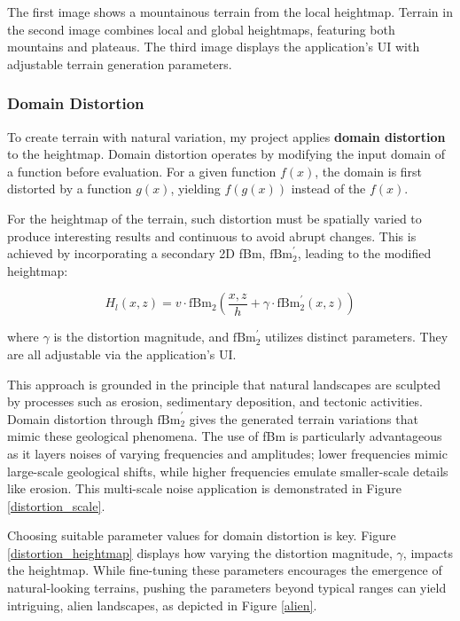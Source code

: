 {The first image shows a mountainous terrain from the local heightmap. Terrain in the second image combines local and global heightmaps, featuring both mountains and plateaus. The third image displays the application's UI with adjustable terrain generation parameters.}


\subsubsection{Domain Distortion}

To create terrain with natural variation, my project applies \textbf{domain distortion} to the heightmap. Domain distortion operates by modifying the input domain of a function before evaluation. For a given function $f(x)$, the domain is first distorted by a function $g(x)$, yielding $f(g(x))$ instead of the $f(x)$.

For the heightmap of the terrain, such distortion must be spatially varied to produce interesting results and continuous to avoid abrupt changes. This is achieved by incorporating a secondary 2D fBm, $\text{fBm}^\prime_2$, leading to the modified heightmap:

\begin{equation}
    H_l(x,z) = v\cdot\text{fBm}_{2}\left(\frac{x,z}{h}+\gamma\cdot\text{fBm}^\prime_2(x,z)\right)
\end{equation}

where $\gamma$ is the distortion magnitude, and $\text{fBm}^\prime_2$ utilizes distinct parameters. They are all adjustable via the application’s UI.

This approach is grounded in the principle that natural landscapes are sculpted by processes such as erosion, sedimentary deposition, and tectonic activities. Domain distortion through $\text{fBm}^\prime_2$ gives the generated terrain variations that mimic these geological phenomena. The use of fBm is particularly advantageous as it layers noises of varying frequencies and amplitudes; lower frequencies mimic large-scale geological shifts, while higher frequencies emulate smaller-scale details like erosion. This multi-scale noise application is demonstrated in Figure \ref{distortion_scale}.

Choosing suitable parameter values for domain distortion is key. Figure \ref{distortion_heightmap} displays how varying the distortion magnitude, $\gamma$, impacts the heightmap. While fine-tuning these parameters encourages the emergence of natural-looking terrains, pushing the parameters beyond typical ranges can yield intriguing, alien landscapes, as depicted in Figure \ref{alien}.

